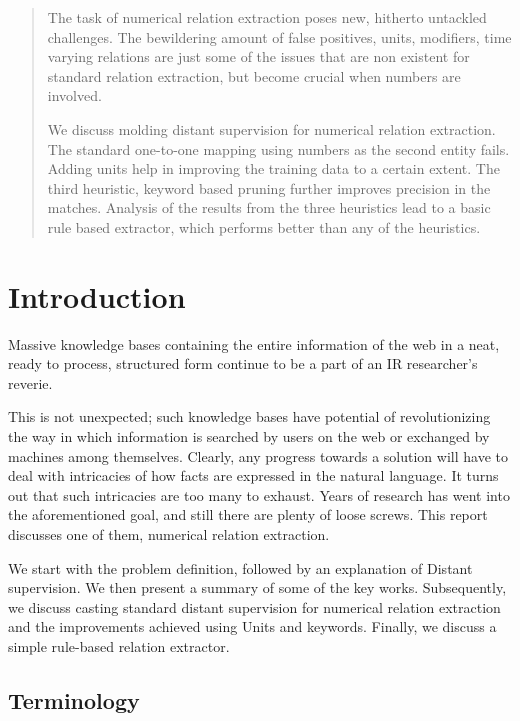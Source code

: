 \documentclass[a4paper,10pt]{article}
\begin{document}
\tableofcontents
\newpage
\begin{abstract}
The task of numerical relation extraction poses new, hitherto untackled challenges. The bewildering amount of false positives, units, 
modifiers, time varying relations are just some of the issues that are non existent for standard relation extraction, but become 
crucial when numbers are involved.

We discuss molding distant supervision for numerical relation extraction. The standard one-to-one mapping using numbers as the second entity 
fails. Adding units help in improving the training data to a certain extent. The third heuristic, keyword based pruning further improves 
precision in the matches.
Analysis of the results from the three heuristics lead to a basic rule based extractor, which performs better than any of the heuristics.


\end{abstract}

\newpage
\section{Introduction}
Massive knowledge bases containing the entire information of the web in a neat, ready to process, structured form continue to be a part of an IR researcher's reverie.

This is not unexpected; such knowledge bases have potential of revolutionizing the way in which information is searched by users on the web or exchanged by machines among
themselves. 
Clearly, any progress towards a solution will have to deal with intricacies of how facts are expressed in the natural language.
It turns out that such intricacies are too many to exhaust. Years of research has went into the aforementioned goal, and still
there are plenty of loose screws. This report discusses one of them, numerical relation extraction.

We start with the problem definition, followed by an explanation of Distant supervision. We then present a summary of some of the
key works. Subsequently, we discuss casting standard distant supervision for numerical relation extraction and the improvements achieved using
Units and keywords. Finally, we discuss a simple rule-based relation extractor.


\subsection{Terminology}
\end{document}

